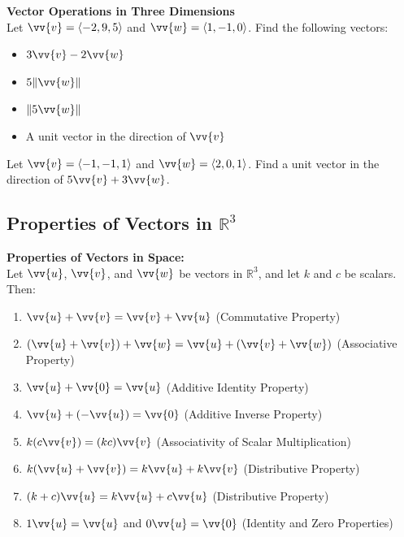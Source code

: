 \documentclass{article}
\begin{document}
\begin{exercisebox}
    \textbf{Vector Operations in Three Dimensions} \\
    Let \(\vv{v} = \langle -2, 9, 5 \rangle\) and \(\vv{w} = \langle 1, -1, 0 \rangle\). Find the following vectors:
    \begin{itemize}
        \item \(3\vv{v} - 2\vv{w}\)
        \item \(5\|\vv{w}\|\)
        \item \(\|5\vv{w}\|\)
        \item A unit vector in the direction of \(\vv{v}\)
    \end{itemize}
\end{exercisebox}

\begin{exercisebox}
    Let \(\vv{v} = \langle -1, -1, 1 \rangle\) and \(\vv{w} = \langle 2, 0, 1 \rangle\). Find a unit vector in the direction of \(5\vv{v} + 3\vv{w}\).
\end{exercisebox}

\subsection*{Properties of Vectors in \(\mathbb{R}^3\)}

\begin{theorembox}
    \textbf{Properties of Vectors in Space:} \\
    Let \(\vv{u}\), \(\vv{v}\), and \(\vv{w}\) be vectors in \(\mathbb{R}^3\), and let \(k\) and \(c\) be scalars. Then:
    \begin{enumerate}
        \item \(\vv{u} + \vv{v} = \vv{v} + \vv{u}\) \quad (Commutative Property)
        \item \((\vv{u} + \vv{v}) + \vv{w} = \vv{u} + (\vv{v} + \vv{w})\) \quad (Associative Property)
        \item \(\vv{u} + \vv{0} = \vv{u}\) \quad (Additive Identity Property)
        \item \(\vv{u} + (-\vv{u}) = \vv{0}\) \quad (Additive Inverse Property)
        \item \(k(c\vv{v}) = (kc)\vv{v}\) \quad (Associativity of Scalar Multiplication)
        \item \(k(\vv{u} + \vv{v}) = k\vv{u} + k\vv{v}\) \quad (Distributive Property)
        \item \((k + c)\vv{u} = k\vv{u} + c\vv{u}\) \quad (Distributive Property)
        \item \(1\vv{u} = \vv{u}\) and \(0\vv{u} = \vv{0}\) \quad (Identity and Zero Properties)
    \end{enumerate}
\end{theorembox}
\end{document}
